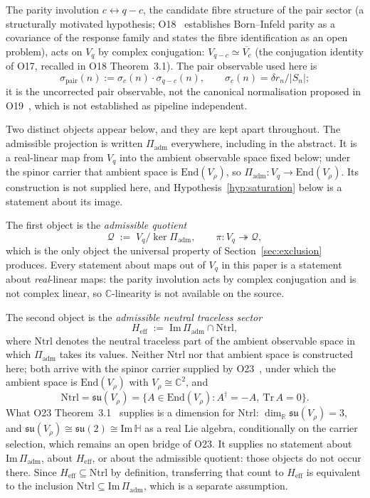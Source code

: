\documentclass[11pt,a4paper]{article}
\theoremstyle{remark}
\begin{document}
  The parity involution $c \leftrightarrow q-c$, the candidate fibre structure of the pair
  sector (a structurally motivated hypothesis; O18~\cite{Beau2026a22} establishes
  Born--Infeld parity as a covariance of the response family and states the fibre identification as an
  open problem), acts on $V_q$ by complex conjugation:
  $V_{q-c} \simeq \overline{V_c}$ (the conjugation identity of O17, recalled in O18
  Theorem~3.1).
  The pair observable used here is
  \[
    \sigma_{\mathrm{pair}}(n) := \sigma_c(n) \cdot \sigma_{q-c}(n),
    \qquad \sigma_c(n) = \delta r_n / |S_n|;
  \]
  it is the uncorrected pair observable, not the canonical normalisation proposed in
  O19~\cite{Beau2026a23}, which is not established as pipeline independent.

  Two distinct objects appear below, and they are kept apart throughout.
  The admissible projection is written $\Pi_{\mathrm{adm}}$ everywhere, including in the abstract.
  It is a real-linear map from $V_q$ into the ambient observable space fixed below; under the spinor
  carrier that ambient space is $\mathrm{End}(V_\rho)$, so
  $\Pi_{\mathrm{adm}} \colon V_q \to \mathrm{End}(V_\rho)$.
  Its construction is not supplied here, and Hypothesis~\ref{hyp:saturation} below is a statement
  about its image.

  The first object is the \emph{admissible quotient}
  \[
    \mathcal{Q} \;:=\; V_q / \ker \Pi_{\mathrm{adm}},
    \qquad \pi \colon V_q \twoheadrightarrow \mathcal{Q} ,
  \]
  which is the only object the universal property of Section~\ref{sec:exclusion} produces.
  Every statement about maps out of $V_q$ in this paper is a statement about
  \emph{real}-linear maps: the parity involution acts by complex conjugation and is not
  complex linear, so $\mathbb{C}$-linearity is not available on the source.

  The second object is the \emph{admissible neutral traceless sector}
  \[
    H_{\mathrm{eff}} \;:=\; \mathrm{Im}\,\Pi_{\mathrm{adm}} \cap \mathrm{Ntrl},
  \]
  where $\mathrm{Ntrl}$ denotes the neutral traceless part of the ambient observable space in which
  $\Pi_{\mathrm{adm}}$ takes its values.
  Neither $\mathrm{Ntrl}$ nor that ambient space is constructed here; both arrive with the spinor
  carrier supplied by O23~\cite{Beau2026a27}, under which the ambient space is
  $\mathrm{End}(V_\rho)$ with $V_\rho \cong \mathbb{C}^2$, and
  \[
    \mathrm{Ntrl} = \mathfrak{su}(V_\rho) = \{ A \in \mathrm{End}(V_\rho) :
    A^\dagger = -A, \ \mathrm{Tr}\,A = 0 \} .
  \]
  What O23 Theorem~3.1~\cite{Beau2026a27} supplies is a dimension for $\mathrm{Ntrl}$:
  $\dim_{\mathbb{R}} \mathfrak{su}(V_\rho) = 3$, and $\mathfrak{su}(V_\rho) \cong \mathfrak{su}(2)
  \cong \mathrm{Im}\,\mathbb{H}$ as a real Lie algebra, conditionally on the carrier selection,
  which remains an open bridge of O23.
  It supplies no statement about $\mathrm{Im}\,\Pi_{\mathrm{adm}}$, about $H_{\mathrm{eff}}$, or
  about the admissible quotient: those objects do not occur there.
  Since $H_{\mathrm{eff}} \subseteq \mathrm{Ntrl}$ by definition, transferring that count to
  $H_{\mathrm{eff}}$ is equivalent to the inclusion
  $\mathrm{Ntrl} \subseteq \mathrm{Im}\,\Pi_{\mathrm{adm}}$, which is a separate assumption.
\end{document}
